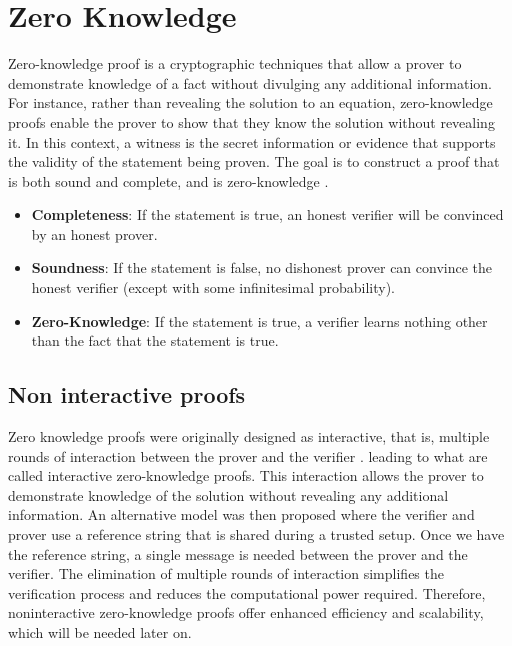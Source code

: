 \section{Zero Knowledge}
Zero-knowledge proof is a cryptographic techniques that allow a prover to demonstrate knowledge of a fact without divulging any additional information. 
For instance, rather than revealing the solution to an equation, zero-knowledge proofs enable the prover to show that they know the solution without revealing it. 
In this context, a witness is the secret information or evidence that supports the validity of the statement being proven. 
The goal is to construct a proof that is both sound and complete, and is zero-knowledge \cite{LZK}.

\begin{itemize}
\item \textbf{Completeness}: If the statement is true, an honest verifier will be convinced by an honest prover.
\item \textbf{Soundness}: If the statement is false, no dishonest prover can convince the honest verifier (except with some infinitesimal probability).
\item \textbf{Zero-Knowledge}: If the statement is true,  a verifier learns nothing other than the fact that the statement is true. \cite{LC23}
\end{itemize}


\subsection{Non interactive proofs}

Zero knowledge proofs were originally designed as interactive, that is, multiple rounds of interaction between the prover and the verifier \cite{GMR89}.
leading to what are called interactive zero-knowledge proofs. This interaction allows the prover to demonstrate knowledge of the solution without revealing any additional information.
An alternative model was then proposed where the verifier and prover use a reference string that is shared during a trusted setup. Once we have the reference string, a single message is needed between the prover and the verifier.
The elimination of multiple rounds of interaction simplifies the verification process and reduces the computational power required.
Therefore, noninteractive zero-knowledge proofs offer enhanced efficiency and scalability, which will be needed later on.  \cite{BFM88} \cite{GMW91}


